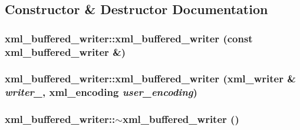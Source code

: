 \subsection{Constructor \& Destructor Documentation}
\hypertarget{classxml__buffered__writer_a6ab927cae021733a4b2e9e7cbbb79c13}{
\subsubsection[{xml\_\-buffered\_\-writer}]{\setlength{\rightskip}{0pt plus 5cm}xml\_\-buffered\_\-writer::xml\_\-buffered\_\-writer (const {\bf xml\_\-buffered\_\-writer} \&)}}
\label{classxml__buffered__writer_a6ab927cae021733a4b2e9e7cbbb79c13}
\hypertarget{classxml__buffered__writer_a3c22ad246e2aebb6597935baf4a223a7}{
\subsubsection[{xml\_\-buffered\_\-writer}]{\setlength{\rightskip}{0pt plus 5cm}xml\_\-buffered\_\-writer::xml\_\-buffered\_\-writer (xml\_\-writer \& {\em writer\_\-}, \/  xml\_\-encoding {\em user\_\-encoding})}}
\label{classxml__buffered__writer_a3c22ad246e2aebb6597935baf4a223a7}
\hypertarget{classxml__buffered__writer_aa0aaa7ca5b9b61fb0e9dd79502e8d728}{
\subsubsection[{$\sim$xml\_\-buffered\_\-writer}]{\setlength{\rightskip}{0pt plus 5cm}xml\_\-buffered\_\-writer::$\sim$xml\_\-buffered\_\-writer ()}}
\label{classxml__buffered__writer_aa0aaa7ca5b9b61fb0e9dd79502e8d728}


